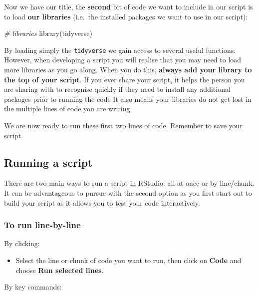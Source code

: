 \documentclass[
]{book}
\newenvironment{Shaded}{\begin{snugshade}}{\end{snugshade}}
\newcommand{\CommentTok}[1]{\textcolor[rgb]{0.56,0.35,0.01}{\textit{#1}}}
\newcommand{\FunctionTok}[1]{\textcolor[rgb]{0.00,0.00,0.00}{#1}}
\newcommand{\NormalTok}[1]{#1}
\providecommand{\tightlist}{%
  \setlength{\itemsep}{0pt}\setlength{\parskip}{0pt}}
\begin{document}
Now we have our title, the \textbf{second} bit of code we want to include in our script is to load \textbf{our libraries} (i.e.~the installed packages we want to use in our script):

\begin{Shaded}
\begin{Highlighting}[]
\CommentTok{\# libraries}
\FunctionTok{library}\NormalTok{(tidyverse)}
\end{Highlighting}
\end{Shaded}

By loading simply the \texttt{tidyverse} we gain access to several useful functions. However, when developing a script you will realise that you may need to load more libraries as you go along. When you do this, \textbf{always add your library to the top of your script}. If you ever share your script, it helps the person you are sharing with to recognise quickly if they need to install any additional packages prior to running the code It also means your libraries do not get lost in the multiple lines of code you are writing.

We are now ready to run these first two lines of code. Remember to save your script.

\hypertarget{running-a-script}{%
\subsection{Running a script}\label{running-a-script}}

There are two main ways to run a script in RStudio: all at once or by line/chunk. It can be advantageous to pursue with the second option as you first start out to build your script as it allows you to test your code interactively.

\hypertarget{to-run-line-by-line}{%
\subsubsection*{To run line-by-line}\label{to-run-line-by-line}}

By clicking:

\begin{itemize}
\tightlist
\item
  Select the line or chunk of code you want to run, then click on \textbf{Code} and choose \textbf{Run selected lines}.
\end{itemize}

By key commands:
\end{document}
